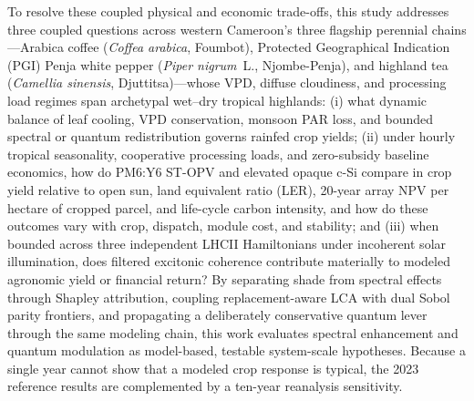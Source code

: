 \documentclass[preprint,12pt,a4paper]{elsarticle}
\begin{document}
To resolve these coupled physical and economic trade-offs, this study addresses three coupled questions across western Cameroon's three flagship perennial chains---Arabica coffee (\textit{Coffea arabica}, Foumbot), Protected Geographical Indication (PGI) Penja white pepper (\textit{Piper nigrum}~L., Njombe-Penja), and highland tea (\textit{Camellia sinensis}, Djuttitsa)---whose VPD, diffuse cloudiness, and processing load regimes span archetypal wet--dry tropical highlands: (i) what dynamic balance of leaf cooling, VPD conservation, monsoon PAR loss, and bounded spectral or quantum redistribution governs rainfed crop yields; (ii) under hourly tropical seasonality, cooperative processing loads, and zero-subsidy baseline economics, how do PM6:Y6 ST-OPV and elevated opaque c-Si compare in crop yield relative to open sun, land equivalent ratio (LER), 20-year array NPV per hectare of cropped parcel, and life-cycle carbon intensity, and how do these outcomes vary with crop, dispatch, module cost, and stability; and (iii) when bounded across three independent LHCII Hamiltonians under incoherent solar illumination, does filtered excitonic coherence contribute materially to modeled agronomic yield or financial return? By separating shade from spectral effects through Shapley attribution, coupling replacement-aware LCA with dual Sobol parity frontiers, and propagating a deliberately conservative quantum lever through the same modeling chain, this work evaluates spectral enhancement and quantum modulation as model-based, testable system-scale hypotheses. Because a single year cannot show that a modeled crop response is typical, the 2023 reference results are complemented by a ten-year reanalysis sensitivity.

\end{document}
